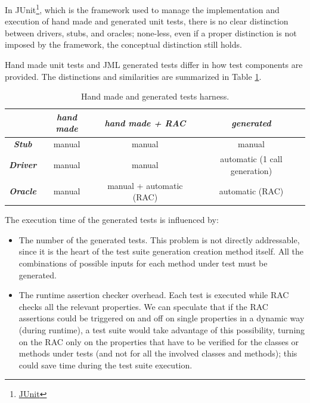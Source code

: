 \documentclass[english]{lni}
\newcommand{\myhref}[2]{\ifpdf\href{#1}{#2}\else\htmladdnormallinkfoot{#2}{#1}\fi}
\begin{document}
In JUnit\footnote{\myhref{http://www.junit.org/}{JUnit}}, which is the framework used to manage the implementation and execution of hand made and generated unit tests, there is no clear distinction between drivers, stubs, and oracles; none-less, even if a proper distinction
is not imposed by the framework, the conceptual distinction still holds.

Hand made unit tests and JML generated tests differ in how test components are provided.
The distinctions and similarities are summarized in Table \ref{tab:test_harness}.
\begin{table}[htbp]
  \caption{Hand made and generated tests harness.}
  \label{tab:test_harness}
  \begin{center}
    \begin{tabular}{|c|c|c|c|}\hline
       & \textbf{\textit{hand made}} & \textbf{\textit{hand made + RAC}} & \textbf{\textit{generated}} \\\hline
      \textbf{\textit{Stub}} & manual & manual & manual\\\hline
      \textbf{\textit{Driver}} & manual & manual & automatic (1 call generation)\\\hline
      \textbf{\textit{Oracle}} & manual & manual + automatic (RAC) & automatic (RAC)\\\hline
    \end{tabular}
  \end{center}
\end{table}

The execution time of the generated tests is influenced by:
\begin{itemize}
\item The number of the generated tests. 
This problem is not directly addressable, since it is the heart of the test suite generation creation method itself. 
All the combinations of possible inputs for each method under test must be generated.
\item The runtime assertion checker overhead. 
Each test is executed while RAC checks all the relevant properties. 
We can speculate that if the RAC assertions could be triggered on and off on single properties in a dynamic way (during runtime), a test suite would take advantage of this possibility, turning on the RAC only on the properties that have to be verified for the classes or methods under tests (and not for all the involved classes and methods); this could save time during the test suite execution.
\end{itemize}
\end{document}
